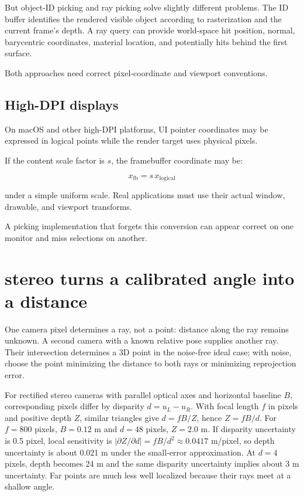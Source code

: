 But object-ID picking and ray picking solve slightly different problems. The ID buffer identifies the rendered visible object according to rasterization and the current frame's depth. A ray query can provide world-space hit position, normal, barycentric coordinates, material location, and potentially hits behind the first surface.

Both approaches need correct pixel-coordinate and viewport conventions.

\subsection{High-DPI displays}\label{02-foundations-ii-ch035-high-dpi-displays}

\hypertarget{02-foundations-ii-ch035-high-dpi-displays}{}

On macOS and other high-DPI platforms, UI pointer coordinates may be expressed in logical points while the render target uses physical pixels.

If the content scale factor is \(s\), the framebuffer coordinate may be:

\[ x_{\mathrm{fb}}=s\,x_{\mathrm{logical}} \]

under a simple uniform scale. Real applications must use their actual window, drawable, and viewport transforms.

A picking implementation that forgets this conversion can appear correct on one monitor and miss selections on another.

\section{stereo turns a calibrated angle into a distance}\label{02-foundations-ii-ch035-stereo-turns-a-calibrated-angle-into-a-distance}

\hypertarget{02-foundations-ii-ch035-stereo-turns-a-calibrated-angle-into-a-distance}{}

One camera pixel determines a ray, not a point: distance along the ray remains unknown. A second camera with a known relative pose supplies another ray. Their intersection determines a 3D point in the noise-free ideal case; with noise, choose the point minimizing the distance to both rays or minimizing reprojection error.

For rectified stereo cameras with parallel optical axes and horizontal baseline \(B\), corresponding pixels differ by disparity \(d=u_L-u_R\). With focal length \(f\) in pixels and positive depth \(Z\), similar triangles give \(d=fB/Z\), hence \(Z=fB/d\). For \(f=800\) pixels, \(B=0.12\) m and \(d=48\) pixels, \(Z=2.0\) m. If disparity uncertainty is 0.5 pixel, local sensitivity is \(|\partial Z/\partial d|=fB/d^2\approx0.0417\) m/pixel, so depth uncertainty is about 0.021 m under the small-error approximation. At \(d=4\) pixels, depth becomes 24 m and the same disparity uncertainty implies about 3 m uncertainty. Far points are much less well localized because their rays meet at a shallow angle.

